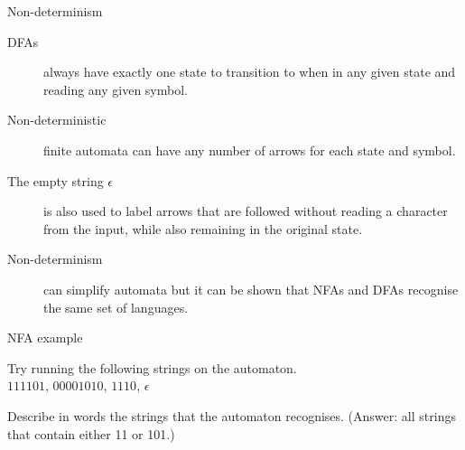 \documentclass{beamer}
\begin{document}
  
  
  \begin{frame}{Non-determinism}
    \begin{description}
      \item[DFAs] always have exactly one state to transition to when in any given state and reading any given symbol.
      \vspace{4mm}
      \item[Non-deterministic] finite automata can have any number of arrows for each state and symbol.
      \vspace{4mm}
      \item[The empty string \( \epsilon \)] is also used to label arrows that are followed without reading a character from the input, while also remaining in the original state.
      \vspace{4mm} 
      \item[Non-determinism] can simplify automata but it can be shown that NFAs and DFAs recognise the same set of languages.
    \end{description}
  \end{frame}
  
  
  \begin{frame}[fragile]{NFA example}
    \begin{center}
    \end{center}
    \begin{center}
      Try running the following strings on the automaton. \\
      \( 111101 \), \( 00001010 \), \( 1110 \), \( \epsilon \) \\
      \pause
      
      \vspace{2mm}
      Describe in words the strings that the automaton recognises.
      \pause
      \vspace{1mm}
      (Answer: all strings that contain either 11 or 101.)
    \end{center}
  \end{frame}
  
\end{document}
